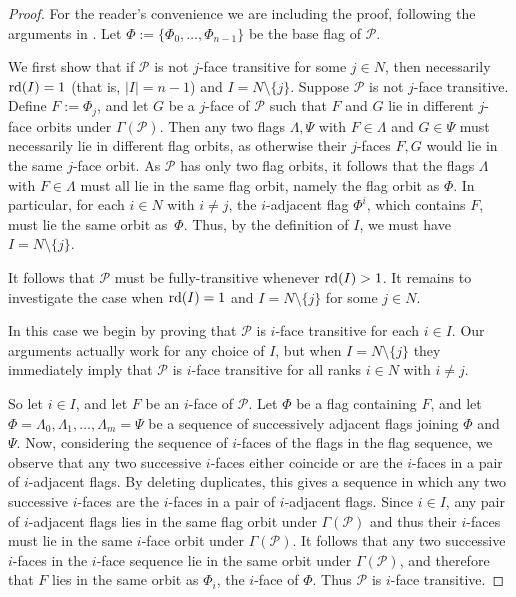 \documentclass[12pt]{article}
\renewcommand{\>}{\rangle}
\theoremstyle{definition}\newtheorem{definition}{Definition}[section]
\begin{document}
\begin{proof}
For the reader's convenience we are including the proof, following the arguments in \cite[pp.\,947-948]{H2010}. Let $\Phi:=\{\Phi_0,\ldots,\Phi_{n-1}\}$ be the base flag of $\mathcal{P}$. 

We first show that if $\mathcal{P}$ is not $j$-face transitive for some $j\in N$, then necessarily ${\rm rd}(I)=1$ (that is, $|I|=n-1$) and $I=N\setminus\{j\}$. Suppose $\mathcal{P}$ is not $j$-face transitive. Define $F:=\Phi_j$, and let $G$ be a $j$-face of $\mathcal{P}$ such that $F$ and $G$ lie in different $j$-face orbits under $\Gamma(\mathcal{P})$. Then any two flags $\Lambda,\Psi$ with  $F\in\Lambda$ and $G\in\Psi$ must necessarily lie in different flag orbits, as otherwise their $j$-faces $F,G$ would lie in the same $j$-face orbit. As $\mathcal{P}$ has only two flag orbits, it follows that the flags $\Lambda$ with $F\in\Lambda$ must all lie in the same flag orbit, namely the flag orbit as $\Phi$. In particular, for each $i\in N$ with $i\neq j$, the $i$-adjacent flag $\Phi^i$, which contains $F$, must lie the same orbit as~$\Phi$. Thus, by the definition of $I$, we must have $I= N\setminus\{j\}$. 

It follows that $\mathcal{P}$ must be fully-transitive whenever ${\rm rd}(I)>1$. It remains to investigate the case when ${\rm rd}(I)=1$ and $I=N\setminus\{j\}$ for some $j\in N$. 

In this case we begin by proving that $\mathcal{P}$ is $i$-face transitive for each $i\in I$. Our arguments actually work for any choice of $I$, but when $I=N\setminus\{j\}$ they immediately imply that $\mathcal{P}$ is $i$-face transitive for all ranks $i\in N$ with $i\neq j$. 

So let $i\in I$, and let $F$ be an $i$-face of $\mathcal{P}$. Let $\Phi$ be a flag containing $F$, and let $\Phi=\Lambda_0,\Lambda_1,\ldots,\Lambda_m=\Psi$ be a sequence of successively adjacent flags joining $\Phi$ and $\Psi$. Now, considering the sequence of $i$-faces of the flags in the flag sequence, we observe that any two successive $i$-faces either coincide or are the $i$-faces in a pair of $i$-adjacent flags. By deleting duplicates, this gives a sequence in which any two successive $i$-faces are the $i$-faces in a pair of $i$-adjacent flags. Since $i\in I$, any pair of $i$-adjacent flags lies in the same flag orbit under $\Gamma(\mathcal{P})$ and thus their $i$-faces must lie in the same $i$-face orbit under $\Gamma(\mathcal{P})$. It follows that any two successive $i$-faces in the $i$-face sequence lie in the same orbit under $\Gamma(\mathcal{P})$, and therefore that $F$ lies in the same orbit as $\Phi_i$, the $i$-face of $\Phi$. Thus $\mathcal{P}$ is $i$-face transitive.


\end{proof}
\end{document}
